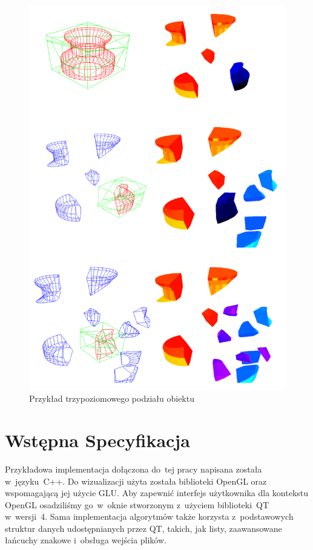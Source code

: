 \documentclass[skorowidz,autorrok,backref,xodstep,oswiadczenie]{wmimgr}
\begin{document}
\begin{figure}[ht!]
\centering
\includegraphics[width=140mm]{images/app4_1.png}
\caption{Przykład trzypoziomowego podziału obiektu}
\label{appdivisionlevels}
\end{figure}

\section{Wstępna Specyfikacja}

Przykładowa implementacja dołączona do~tej pracy napisana została w~języku~C++. Do wizualizacji użyta została biblioteki OpenGL oraz wspomagającą jej użycie GLU. Aby zapewnić interfejs użytkownika dla kontekstu OpenGL osadziliśmy go~w~oknie stworzonym z~użyciem biblioteki~QT w~wersji~4. Sama implementacja algorytmów także korzysta z~podstawowych struktur danych udostępnianych przez QT, takich, jak listy, zaawansowane łańcuchy znakowe i~obsługa wejścia plików.
\end{document}
